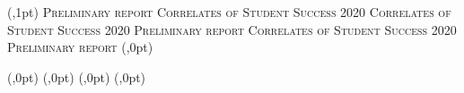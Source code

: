 %
{(\textwidth,1pt)%
{\scshape Preliminary report \hfill Correlates of Student Success 2020}%
{\scshape Correlates of Student Success 2020 \hfill Preliminary report}%
{\scshape Correlates of Student Success 2020 \hfill Preliminary report} %
(\textwidth,0pt)%
}

%
	{(\textwidth,0pt)%
		{\hfill}{\hfill}{\hfill}%
	(\textwidth,0pt)}%
	{(\textwidth,0pt)%
		{\hfill}{\hfill}{\hfill}%
	(\textwidth,0pt)}

\renewcommand{\footnoterule}{\rule{5cm}{0.2mm} \vspace{0.3cm}} %

\renewcommand{\thefigure}{\thesection-\arabic{figure}}

\setcounter{tocdepth}{3}
\setcounter{secnumdepth}{3}



\pagestyle{plain} %
